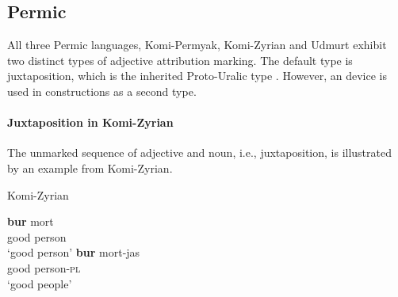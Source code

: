 \subsection{Permic}
All three Permic languages, Komi-Permyak, Komi-Zyrian and Udmurt exhibit two distinct types of adjective attribution marking. The default type is juxtaposition, which is the inherited Proto\hyp{}Uralic type \citep[80–81]{decsy1990}. However, an  device is used in  constructions as a second type.

\paragraph*{Juxtaposition in Komi-Zyrian}
The unmarked sequence of adjective and noun, i.e., juxtaposition, is illustrated by an example from Komi-Zyrian.
\begin{exe}
\ex \rm{Komi-Zyrian \citep[287]{lytkin1966a}}
\begin{xlist} 
\ex
\gll 		\textbf{bur} 	mort\\
		good	person\\
\glt		‘good person’
\ex
\gll		\textbf{bur}	mort-jas\\
		good	person-\textsc{pl}\\
\glt		‘good people’
\end{xlist}
\end{exe}

